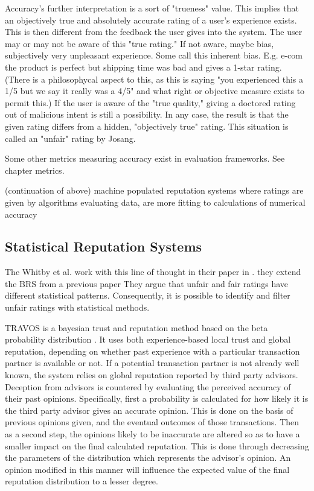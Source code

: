 \documentclass[%
    ]{\PathToTumTemplate/thesis/tum_thesis}
\begin{document}
Accuracy's further interpretation is a sort of "trueness" value. This implies that an objectively true and absolutely accurate rating of a user's experience exists.
This is then different from the feedback the user gives into the system.
The user may or may not be aware of this "true rating." If not aware, maybe bias, subjectively very unpleasant experience. Some call this inherent bias. E.g. e-com the product is perfect but shipping time was bad and gives a 1-star rating. 
(There is a philosophycal aspect to this, as this is saying "you experienced this a 1/5 but we say it really was a 4/5" and what right or objective measure exists to permit this.)
If the user is aware of the "true quality," giving a doctored rating out of malicious intent is still a possibility. 
In any case, the result is that the given rating differs from a hidden, "objectively true" rating. This situation is called an "unfair" rating by Josang.

Some other metrics measuring accuracy exist in evaluation frameworks. See chapter metrics.


(continuation of above) machine populated reputation systems where ratings are given by algorithms evaluating data, are more fitting to calculations of numerical accuracy



\subsection{Statistical Reputation Systems}

The Whitby et al. work with this line of thought in their paper in \cite{whitby_filtering_2014}. 
they extend the BRS from a previous paper
They argue that unfair and fair ratings have different statistical patterns. Consequently, it is possible to identify and filter unfair ratings with statistical methods.


TRAVOS is a bayesian trust and reputation method based on the beta probability distribution \cite{teacy_travos_2006}. It uses both experience-based local trust and global reputation, depending on whether past experience with a particular transaction partner is available or not. If a potential transaction partner is not already well known, the system relies on global reputation reported by third party advisors. Deception from advisors is countered by evaluating the perceived accuracy of their past opinions. Specifically, first a probability is calculated for how likely it is the third party advisor gives an accurate opinion. This is done on the basis of previous opinions given, and the eventual outcomes of those transactions. Then as a second step, the opinions likely to be inaccurate are altered so as to have a smaller impact on the final calculated reputation. This is done through decreasing the parameters of the distribution which represents the advisor's opinion. An opinion modified in this manner will influence the expected value of the final reputation distribution to a lesser degree.
\end{document}
